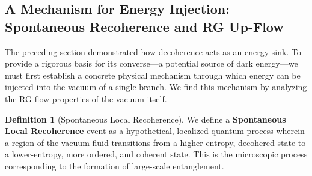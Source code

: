 \documentclass[11pt, letterpaper]{report}
\theoremstyle{plain} %
\theoremstyle{definition} %
\newtheorem{definition}{Definition}[chapter]
\theoremstyle{remark} %
\begin{document}
\subsection{A Mechanism for Energy Injection: Spontaneous Recoherence and RG Up-Flow}
\label{subsec:recoherence_rg_upflow}

The preceding section demonstrated how decoherence acts as an energy sink. To provide a rigorous basis for its converse—a potential source of dark energy—we must first establish a concrete physical mechanism through which energy can be injected into the vacuum of a single branch. We find this mechanism by analyzing the RG flow properties of the vacuum itself.

\begin{definition}[Spontaneous Local Recoherence]
We define a \textbf{Spontaneous Local Recoherence} event as a hypothetical, localized quantum process wherein a region of the vacuum fluid transitions from a higher-entropy, decohered state to a lower-entropy, more ordered, and coherent state. This is the microscopic process corresponding to the formation of large-scale entanglement.
\end{definition}
\end{document}
